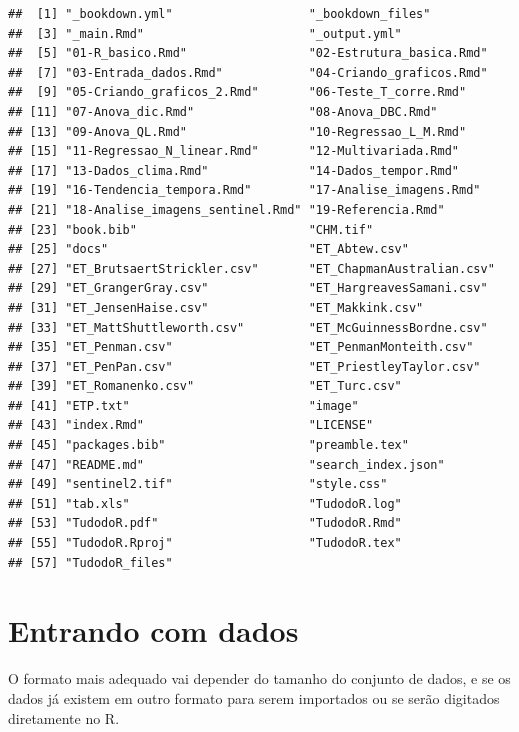\documentclass[
]{book}
\begin{document}
\begin{verbatim}
##  [1] "_bookdown.yml"                   "_bookdown_files"                
##  [3] "_main.Rmd"                       "_output.yml"                    
##  [5] "01-R_basico.Rmd"                 "02-Estrutura_basica.Rmd"        
##  [7] "03-Entrada_dados.Rmd"            "04-Criando_graficos.Rmd"        
##  [9] "05-Criando_graficos_2.Rmd"       "06-Teste_T_corre.Rmd"           
## [11] "07-Anova_dic.Rmd"                "08-Anova_DBC.Rmd"               
## [13] "09-Anova_QL.Rmd"                 "10-Regressao_L_M.Rmd"           
## [15] "11-Regressao_N_linear.Rmd"       "12-Multivariada.Rmd"            
## [17] "13-Dados_clima.Rmd"              "14-Dados_tempor.Rmd"            
## [19] "16-Tendencia_tempora.Rmd"        "17-Analise_imagens.Rmd"         
## [21] "18-Analise_imagens_sentinel.Rmd" "19-Referencia.Rmd"              
## [23] "book.bib"                        "CHM.tif"                        
## [25] "docs"                            "ET_Abtew.csv"                   
## [27] "ET_BrutsaertStrickler.csv"       "ET_ChapmanAustralian.csv"       
## [29] "ET_GrangerGray.csv"              "ET_HargreavesSamani.csv"        
## [31] "ET_JensenHaise.csv"              "ET_Makkink.csv"                 
## [33] "ET_MattShuttleworth.csv"         "ET_McGuinnessBordne.csv"        
## [35] "ET_Penman.csv"                   "ET_PenmanMonteith.csv"          
## [37] "ET_PenPan.csv"                   "ET_PriestleyTaylor.csv"         
## [39] "ET_Romanenko.csv"                "ET_Turc.csv"                    
## [41] "ETP.txt"                         "image"                          
## [43] "index.Rmd"                       "LICENSE"                        
## [45] "packages.bib"                    "preamble.tex"                   
## [47] "README.md"                       "search_index.json"              
## [49] "sentinel2.tif"                   "style.css"                      
## [51] "tab.xls"                         "TudodoR.log"                    
## [53] "TudodoR.pdf"                     "TudodoR.Rmd"                    
## [55] "TudodoR.Rproj"                   "TudodoR.tex"                    
## [57] "TudodoR_files"
\end{verbatim}

\hypertarget{entrando-com-dados}{%
\section{Entrando com dados}\label{entrando-com-dados}}

O formato mais adequado vai depender do tamanho do conjunto de dados, e se os dados já existem em outro formato para serem importados ou se serão digitados diretamente no R.
\end{document}
